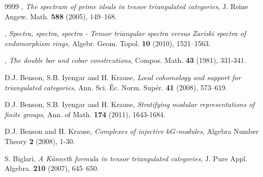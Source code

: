 \documentclass[a4paper, 11pt]{amsart}
\theoremstyle{definition}
\theoremstyle{remark}
\numberwithin{equation}{section}
\begin{document}
\begin{thebibliography}{9999}
, {\em The spectrum of prime ideals in tensor triangulated categories,} J. Reine Angew. Math. {\bf 588} (2005), 149–168.

, {\em Spectra, spectra, spectra - Tensor triangular spectra versus Zariski spectra of endomorphism rings,} Algebr. Geom. Topol. {\bf 10} (2010), 1521–1563.


, {\em The double bar and cobar constrcutions,} Compos. Math. {\bf 43} (1981), 331-341.

 {\sc D.J. Benson, S.B. Iyengar and H. Krause},
{\em Local cohomology and support for triangulated categories}, Ann.
Sci. \'{E}c. Norm. Sup\'{e}r. {\bf 41} (2008), 573–619. 

 {\sc D.J. Benson, S.B. Iyengar and H. Krause},
{\em Stratifying modular representations of finite groups}, Ann. of Math. {\bf 174} (2011), 1643-1684. 


 {\sc D.J. Benson and H. Krause}, {\em Complexes of injective $kG$-modules}, Algebra Number Theory {\bf 2} (2008), 1-30. 


 {\sc S. Biglari}, {\em A K\"unneth formula in tensor triangulated categories}, J. Pure Appl. Algebra. {\bf 210} (2007), 645–650.










\end{thebibliography}
\end{document}
